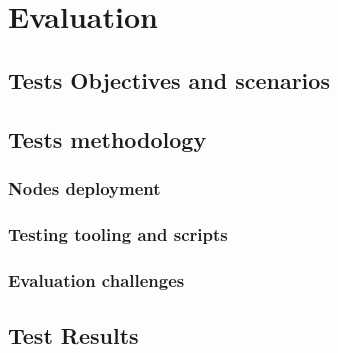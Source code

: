 \chapter{Evaluation}
\label{chapter:evaluation}

\section{Tests Objectives and scenarios}

\section{Tests methodology}

\subsection{Nodes deployment}

\subsection{Testing tooling and scripts}

\subsection{Evaluation challenges}

\section{Test Results}
